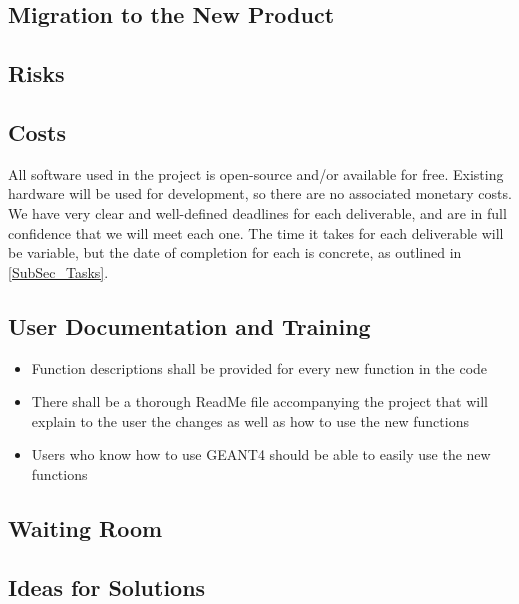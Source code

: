 \documentclass[12pt]{article}
\begin{document}
\subsection{Migration to the New Product} %
\subsection{Risks} %
\subsection{Costs} %
All software used in the project is open-source and/or available for free. Existing hardware will be used for development, so there are no associated monetary costs.\\

We have very clear and well-defined deadlines for each deliverable, and are in full confidence that we will meet each one. The time it takes for each deliverable will be variable, but the date of completion for each is concrete, as outlined in \ref{SubSec_Tasks}.

\subsection{User Documentation and Training} %
\begin{itemize}
	\item Function descriptions shall be provided for every new function in the code
	\item There shall be a thorough ReadMe file accompanying the project that will explain to the user the changes as well as how to use the new functions
	\item Users who know how to use GEANT4 should be able to easily use the new functions
\end{itemize}
\subsection{Waiting Room} %
\subsection{Ideas for Solutions} %
\end{document}
